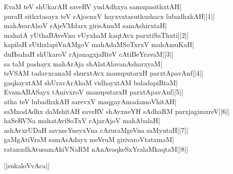 \documentclass{article}
\begin{document}
EvaM teV shUkarAH saveRV yudAdhxya samupasithxtAH|\\
puraH sithxtasayx teV rAjocnxV hayxvatasuthxshacx lubadhxkAH||1||\\
mahAvarAhoV rAjeVMdarx girisAnuM samAshirxtaH|\\
mahatA yUthaBAveVna vUyxhaM kaqtAvx parxtiSaThxti||2||\\
kapilaH sUthxlapiVnAMgoV mahAdaMSoTxrxV mahAmuKaH|\\
duHsahaH shUkaroV rAjanagxjaRteV cAtiBeYravaM||3||\\
sa taM pashayx mahArAja shAlatAlavanAsharxyaM|\\
teVSAM tadavxcanaM shurxtAvx manuputarxH parxtApavAnf||4||\\
gaqhayxtAM shUravArAhaM vidhayxtAM baladapiRtaM|\\
EvamABASayx tAnivxroV manuputarxH parxtApavAnf||5||\\
atha teV lubadhxkAH sarevxV maqgayAmadamoVhitAH|\\
saMnadAdhx daMshitAH saveRV shAvxneYH sAdhaRM parxjagimxreV||6||\\
haSeRVNa mahatAviSoTxV rAjarAjoV mahAbalaH|\\
ashAvxrUDaH savxseYneyxVna cAruraMgeVna saMyutaH||7||\\
gaMgAtiVraM samAsAdayx meVruM girivaroVtatxmaM|\\
ratanxdhAtusamAkiVNaRM nAnAvaqkeSxYralaMkaqtaM||8||\\

\begin{center}
||sukaloVvAca||
\end{center}
\end{document}
